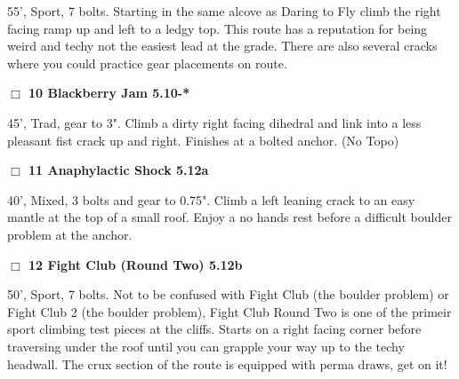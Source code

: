 \begin{multicols}{2}
\begin{adjustwidth}{1.3em}{}
55', Sport, 7 bolts. Starting in the same alcove as Daring to Fly climb the right facing ramp up and left to a ledgy top. This route has a reputation for being weird and techy not the easiest lead at the grade. There are also several cracks where you could practice gear placements on route.
\end{adjustwidth}




\needspace{2em}
\label{rt:Blackberry Jam}
\colorbox{RoyalBlue!20}{
\parbox{0.95\linewidth}{
\hspace{-1ex}\textbf{$\Box$
10 Blackberry Jam 5.10-*  
}}}
\begin{adjustwidth}{1.3em}{}			

45', Trad, gear to 3". Climb a dirty right facing dihedral and link into a less pleasant fist crack up and right. Finishes at a bolted anchor.
  (No Topo)
\end{adjustwidth}




\needspace{2em}
\label{rt:Anaphylactic Shock}
\colorbox{Goldenrod!20}{
\parbox{0.95\linewidth}{
\hspace{-1ex}\textbf{$\Box$
11 Anaphylactic Shock 5.12a  
}}}
\begin{adjustwidth}{1.3em}{}			

40', Mixed, 3 bolts and gear to 0.75". Climb a left leaning crack to an easy mantle at the top of a small roof. Enjoy a no hands rest before a difficult boulder problem at the anchor.
\end{adjustwidth}




\needspace{2em}
\label{rt:Fight Club (Round Two)}
\colorbox{Goldenrod!20}{
\parbox{0.95\linewidth}{
\hspace{-1ex}\textbf{$\Box$
12 Fight Club (Round Two) 5.12b  
}}}
\begin{adjustwidth}{1.3em}{}			

50', Sport, 7 bolts. Not to be confused with Fight Club (the boulder problem) or Fight Club 2 (the boulder problem), Fight Club Round Two is one of the primeir sport climbing test pieces at the cliffs. Starts on a right facing corner before traversing under the roof until you can grapple your way up to the techy headwall. The crux section of the route is equipped with perma draws, get on it!
\end{adjustwidth}





\end{multicols}
